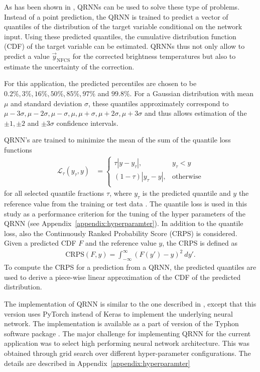 \documentclass[amt, manuscript]{copernicus}
\newcommand{\ynfcs}{\vec{y}_\text{NFCS}}
\begin{document}
As has been shown in \citet{pfreundschuh:aneur:18}, QRNNs can be used to solve
these type of problems. Instead of a point prediction, the QRNN is trained to
predict a vector of quantiles of the distribution of the target variable
conditional on the network input. Using these predicted quantiles, the cumulative
distribution function (CDF) of the target variable can be estimated. QRNNs thus
not only allow to predict a value $\ynfcs$ for the corrected brightness temperatures
but also to estimate the uncertainty of the correction.

For this application, the predicted percentiles are chosen to be
$0.2\%, 3\%, 16\%, 50\%, 85\%, 97\%$ and $99.8\%$. For a Gaussian
distribution with mean $\mu$ and standard deviation $\sigma$, these quantiles
approximately correspond to $\mu -3\sigma, \mu-2\sigma, \mu-\sigma
, \mu, \mu + \sigma, \mu + 2\sigma, \mu + 3\sigma$ and thus allows
estimation of the $\pm 1, \pm 2$ and $\pm 3\sigma$ confidence intervals.

QRNN's are trained to minimize the mean of the sum of the quantile loss functions
%
\begin{align}
  \mathcal{L}_\tau(y_\tau, y) &=
  \begin{cases}
    \tau|y - y_\tau|, & y_\tau < y \\ (1 - \tau)|y_\tau - y|, & \text{otherwise}
    \\
  \end{cases}
\end{align}
%
for all selected quantile fractions $\tau$, where $y_\tau$ is the predicted
quantile and $y$ the reference value from the training or test data . The
quantile loss is used in this study as a performance criterion for the tuning of
the hyper parameters of the QRNN (see Appendix~\ref{appendix:hyperparamter}). In
addition to the quantile loss, also the Continuously Ranked Probability Score
(CRPS) is considered. Given a predicted CDF
$F$ and the reference value $y$, the CRPS is defined as
%
\begin{align}
  \text{CRPS}(F, y) = \int_{-\infty}^{\infty} \left (F(y') - y\right )^2\: dy'.
\end{align}
%
To compute the CRPS for a prediction from a QRNN, the predicted quantiles are
used to derive a piece-wise linear approximation of the CDF of the predicted
distribution.

The implementation of QRNN is similar to the one described in
\citet{pfreundschuh:aneur:18}, except that this version uses PyTorch
\citep{paszke2017automatic} instead of Keras \citep{chollet2015keras} to
implement the underlying neural network. The implementation is available as a
part of version of the Typhon software package \citep{typhonv08}. The major
challenge for implementing QRNN for the current application was to select high
performing neural network architecture. This was obtained through grid search
over different hyper-parameter configurations. The details are described in
Appendix~\ref{appendix:hyperparamter}
\end{document}
